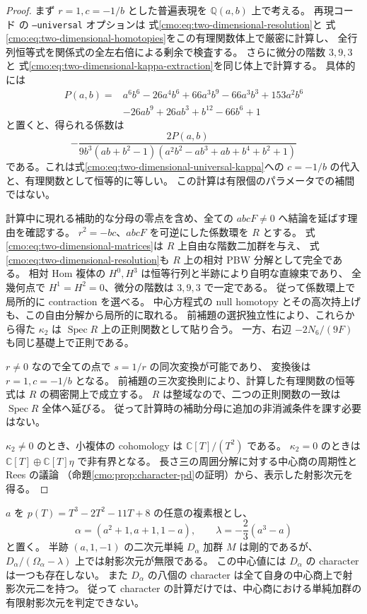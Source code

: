 \begin{proof}
まず $r=1,c=-1/b$ とした普遍表現を
$\mathbb Q(a,b)$ 上で考える。
再現コード  の
\texttt{--universal} オプションは
式\eqref{cmo:eq:two-dimensional-resolution}と
式\eqref{cmo:eq:two-dimensional-homotopies}をこの有理関数体上で厳密に計算し、
全行列恒等式を関係式の全左右倍による剰余で検査する。
さらに微分の階数 $3,9,3$ と
式\eqref{cmo:eq:two-dimensional-kappa-extraction}を同じ体上で計算する。
具体的には
\[
 \begin{split}
 P(a,b)={}&a^6b^6-26a^4b^6+66a^3b^9-66a^3b^3+153a^2b^6\\
 &-26ab^9+26ab^3+b^{12}-66b^6+1
 \end{split}
\]
と置くと、得られる係数は
\[
 -\frac{2P(a,b)}
 {9b^3(ab+b^2-1)(a^2b^2-ab^3+ab+b^4+b^2+1)}
\]
である。これは式\eqref{cmo:eq:two-dimensional-universal-kappa}への
$c=-1/b$ の代入と、有理関数として恒等的に等しい。
この計算は有限個のパラメータでの補間ではない。

計算中に現れる補助的な分母の零点を含め、全ての
$abcF\ne0$ へ結論を延ばす理由を確認する。
$r^2=-bc$、$abcF$ を可逆にした係数環を $R$ とする。
式\eqref{cmo:eq:two-dimensional-matrices}は $R$ 上自由な階数二加群を与え、
式\eqref{cmo:eq:two-dimensional-resolution}も $R$ 上の相対 PBW 分解として完全である。
相対 Hom 複体の $H^0,H^3$ は恒等行列と半跡により自明な直線束であり、
全幾何点で $H^1=H^2=0$、微分の階数は $3,9,3$ で一定である。
従って係数環上で局所的に contraction を選べる。
中心方程式の null homotopy とその高次持上げも、この自由分解から局所的に取れる。
前補題の選択独立性により、これらから得た $\kappa_2$ は $\operatorname{Spec}R$ 上の正則関数として貼り合う。
一方、右辺 $-2N_6/(9F)$ も同じ基礎上で正則である。

$r\ne0$ なので全ての点で $s=1/r$ の同次変換が可能であり、
変換後は $r=1,c=-1/b$ となる。
前補題の三次変換則により、計算した有理関数の恒等式は $R$ の稠密開上で成立する。
$R$ は整域なので、二つの正則関数の一致は $\operatorname{Spec}R$ 全体へ延びる。
従って計算時の補助分母に追加の非消滅条件を課す必要はない。

$\kappa_2\ne0$ のとき、小複体の cohomology は $\mathbb C[T]/(T^2)$ である。
$\kappa_2=0$ のときは $\mathbb C[T]\oplus\mathbb C[T]\eta$ で非有界となる。
長さ三の周囲分解に対する中心商の周期性と Rees の議論
（命題\ref{cmo:prop:character-pd}の証明）から、表示した射影次元を得る。
\end{proof}

\begin{example}
\label{cmo:ex:two-dimensional-zero-action}
$a$ を $p(T)=T^3-2T^2-11T+8$ の任意の複素根とし、
\[
 \alpha=(a^2+1,a+1,1-a),\qquad
 \lambda=-\frac23(a^3-a)
\]
と置く。
半跡 $(a,1,-1)$ の二次元単純 $D_\alpha$ 加群 $M$ は剛的であるが、
$D_\alpha/(\Omega_\alpha-\lambda)$ 上では射影次元が無限である。
この中心値には $D_\alpha$ の character は一つも存在しない。
また $D_\alpha$ の八個の character は全て自身の中心商上で射影次元二を持つ。
従って character の計算だけでは、中心商における単純加群の有限射影次元を判定できない。
\end{example}

